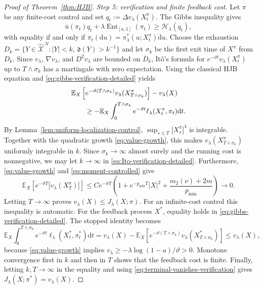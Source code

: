 \documentclass[11pt]{article}
\def\E{\mathbb{E}}
\def\Xc{{\mathcal X}}
\def\hX{\widehat{\Xc}^{\,N}}
\newcommand{\dd}{\mathrm{d}}
\newcommand{\Ent}{\operatorname{Ent}}
\newcommand{\pmin}{p_{\min}}
\theoremstyle{definition}
\theoremstyle{remark}
\numberwithin{equation}{section}
\begin{document}
\begin{proof}[Proof of Theorem~\ref{thm:HJB}]
\medskip
\noindent\textit{Step 5: verification and finite feedback cost.}
Let $\pi$ be any finite-cost control and set
$q_t:=\Delta v_\lambda(X_t^\pi)$.  The Gibbs inequality gives
\begin{equation}\label{eq:gibbs-verification-detailed}
 \bar u(\pi_t)q_t+\lambda\Ent_{[a,1]}(\pi_t)
 \ge\mathscr H_\lambda(q_t),
\end{equation}
with equality if and only if
$\pi_t(\dd u)=\pi_\lambda^*(u;X_t^\pi)\dd u$.
Choose the exhaustion
$D_k=\{Y\in\hX:|Y|<k,\ \mathfrak d(Y)>k^{-1}\}$ and let
$\sigma_k$ be the first exit time of $X^\pi$ from $D_k$.  Since
$v_\lambda$, $\nabla v_\lambda$, and $D^2v_\lambda$ are bounded on
$\overline D_k$, It\^o's formula for
$e^{-\vartheta t}v_\lambda(X_t^\pi)$ up to $T\wedge\sigma_k$ has a martingale with zero expectation.
Using the classical HJB equation and \eqref{eq:gibbs-verification-detailed} yields
\begin{align}
 &\E_X\left[e^{-\vartheta(T\wedge\sigma_k)}
 v_\lambda(X_{T\wedge\sigma_k}^\pi)\right]-v_\lambda(X)\notag\\
 &\qquad\ge-\E_X\int_0^{T\wedge\sigma_k}e^{-\vartheta t}
 \ell_\lambda(X_t^\pi,\pi_t)\dd t.
 \label{eq:Ito-verification-detailed}
\end{align}
By Lemma~\ref{lem:uniform-localization-control},
$\sup_{s\le T}|X_s^\pi|^4$ is integrable.  Together with the quadratic growth
\eqref{eq:value-growth}, this makes
$v_\lambda(X_{T\wedge\sigma_k}^\pi)$ uniformly integrable in $k$.  Since
$\sigma_k\to\infty$ almost surely and the running cost is nonnegative, we may let $k\to\infty$ in
\eqref{eq:Ito-verification-detailed}.  Furthermore, \eqref{eq:value-growth} and
\eqref{eq:moment-controlled} give
\begin{equation}\label{eq:terminal-vanishes-verification}
 \E_X\left[e^{-\vartheta T}|v_\lambda(X_T^\pi)|\right]
 \le C e^{-\vartheta T}
 \left(1+e^{-\pmin T}|X|^2+\frac{m_2(\nu)+2m}{\pmin}\right)
 \longrightarrow0.
\end{equation}
Letting $T\to\infty$ proves
$v_\lambda(X)\le J_\lambda(X;\pi)$.  For an infinite-cost control this inequality is automatic.
For the feedback process $X^*$, equality holds in
\eqref{eq:gibbs-verification-detailed}.  The stopped identity becomes
\[
 \E_X\int_0^{T\wedge\sigma_k}e^{-\vartheta t}
 \ell_\lambda(X_t^*,\pi_t^*)\dd t
 =v_\lambda(X)-
 \E_X\left[e^{-\vartheta(T\wedge\sigma_k)}
 v_\lambda(X_{T\wedge\sigma_k}^*)\right]
 \le v_\lambda(X),
\]
because \eqref{eq:value-growth} implies
$v_\lambda\ge-\lambda\log(1-a)/\vartheta>0$.  Monotone convergence first in $k$ and then in $T$
shows that the feedback cost is finite.  Finally, letting $k,T\to\infty$ in the equality and using
\eqref{eq:terminal-vanishes-verification} gives
$J_\lambda(X;\pi^*)=v_\lambda(X)$.
\end{proof}
\end{document}
